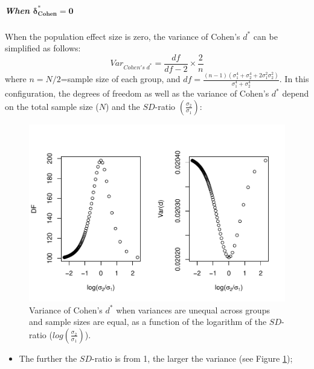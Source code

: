 \documentclass[
  english,
  man,mask]{apa6}
\providecommand{\tightlist}{%
  \setlength{\itemsep}{0pt}\setlength{\parskip}{0pt}}
\let\oldsubparagraph\subparagraph
\renewcommand{\subparagraph}[1]{\oldsubparagraph{#1}\mbox{}}
\begin{document}
\hypertarget{when-bmdelta_cohen-0-1}{%
\subparagraph{\texorpdfstring{When \(\bm{\delta^*_{Cohen} = 0}\)}{When \textbackslash bm\{\textbackslash delta\^{}*\_\{Cohen\} = 0\}}}\label{when-bmdelta_cohen-0-1}}

When the population effect size is zero, the variance of Cohen's \(d^*\) can be simplified as follows:
\[Var_{Cohen's \; d^*} = \frac{df}{df-2} \times \frac{2}{n}\]
where \(n=N/2\)=sample size of each group, and \(df=\frac{(n-1)(\sigma^4_1+\sigma^4_2+2\sigma^2_1\sigma^2_2)}{\sigma^4_1+\sigma^4_2}\). In this configuration, the degrees of freedom as well as the variance of Cohen's \(d^*\) depend on the total sample size (\(N\)) and the \(SD\)-ratio \(\left( \frac{\sigma_2}{\sigma_1}\right)\):

\begin{figure}
\centering
\includegraphics{SupMat1_files/figure-latex/varcohendprimehetbalSDratio2-1.pdf}
\caption{\label{fig:varcohendprimehetbalSDratio2}Variance of Cohen's \(d^*\) when variances are unequal across groups and sample sizes are equal, as a function of the logarithm of the \(SD\)-ratio (\(log \left( \frac{\sigma_2}{\sigma_1} \right)\)).}
\end{figure}

\begin{itemize}
\tightlist
\item
  The further the \(SD\)-ratio is from 1, the larger the variance (see Figure \ref{fig:varcohendprimehetbalSDratio2});
\end{itemize}
\end{document}
